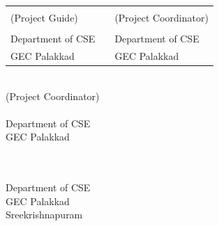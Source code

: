 	
	\begin{singlespace}
		\vspace*{1cm}
		\begin{table}[h!]
			\centering
			\begin{tabular}{p{7cm} p{0.9cm} p{7cm}} 
				\textbf{\cGuide} && \textbf{\cCordOne} \\
				(Project Guide) &&  (Project Coordinator)\\
				\cGuideDes & & \cCordOneDes\\ 
				Department of CSE && Department of CSE\\ 
				GEC Palakkad & &GEC Palakkad\\
				
			\end{tabular}
			
		\end{table}
		
		\vspace*{0.2cm}
		
		\begin{center}
			\textbf{\cCordTwo} \\ 
			(Project Coordinator)\\
			\cCordTwoDes\\ 
			Department of CSE\\ 
			GEC Palakkad
		\end{center}

		\vspace*{0.2cm}
		
		\begin{center}
			
			\textbf{\cHod} \\ 
			\cHodDes \\ 
			Department of CSE\\ 
			GEC Palakkad\\
			Sreekrishnapuram\\
			
		\end{center}
	\end{singlespace}
	
	\thispagestyle{empty}




